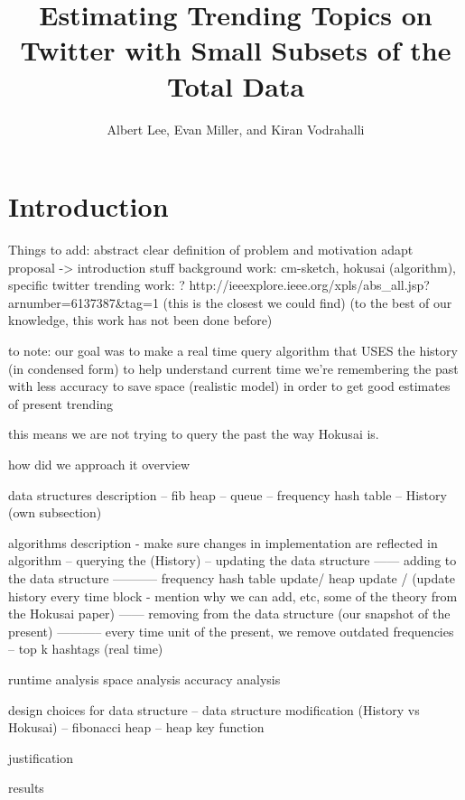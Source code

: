 \documentclass[a4paper,12pt]{article}
\begin{document}
\title{Estimating Trending Topics on Twitter with Small Subsets of the Total Data}

\author{Albert Lee, Evan Miller, and Kiran Vodrahalli}

\maketitle

\section{Introduction}


Things to add:
abstract
clear definition of problem and motivation 
adapt proposal -> introduction stuff
background work: cm-sketch, hokusai (algorithm), specific twitter trending work: ? 
http://ieeexplore.ieee.org/xpls/abs_all.jsp?arnumber=6137387&tag=1 
(this is the closest we could find)
(to the best of our knowledge, this work has not been done before)

to note: our goal was to make a real time query algorithm that USES
the history (in condensed form) to help understand current time 
we're remembering the past with less accuracy to save space (realistic model)
in order to get good estimates of present trending

this means we are not trying to query the past the way Hokusai is.

how did we approach it 
overview

data structures
description
-- fib heap
-- queue
-- frequency hash table
-- History (own subsection)

algorithms
description
- make sure changes in implementation are reflected in algorithm 
-- querying the (History)
-- updating the data structure
------ adding to the data structure
----------- frequency hash table update/ heap update / (update history every time block - mention why we can add, etc, some of the theory from the Hokusai paper)
------ removing from the data structure (our snapshot of the present)
----------- every time unit of the present, we remove outdated frequencies
-- top k hashtags (real time)

runtime analysis
space analysis
accuracy analysis

design choices for data structure
-- data structure modification (History vs Hokusai)
-- fibonacci heap 
-- heap key function 

justification


results
\end{document}
